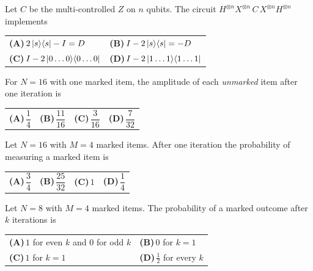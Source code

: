 \documentclass[11pt,a4paper]{article}
\newcommand{\optlabel}[1]{\textbf{(#1)}}
\newenvironment{qitem}[1]{\begin{list}{}{\setlength{\leftmargin}{3.3em}\setlength{\labelwidth}{3.1em}%
  \setlength{\labelsep}{0.2em}\setlength{\topsep}{3pt}\setlength{\parsep}{3pt}}\item[\textbf{Q.#1}\hfill]}{\end{list}}
\newcommand{\qsep}{\par\vspace{2pt}{\color{black!15}\hrule}\vspace{4pt}}
\begin{document}
\begin{qitem}{47}
Let $C$ be the multi-controlled $Z$ on $n$ qubits. The circuit $H^{\otimes n}X^{\otimes n}\,C\,X^{\otimes n}H^{\otimes n}$ implements
\par\smallskip\noindent\begin{tabularx}{\linewidth}{@{}*{2}{L}@{}}
\optlabel{A}\,$2\ket{s}\!\bra{s} - I = D$ & \optlabel{B}\,$I - 2\ket{s}\!\bra{s} = -D$ \\[3pt]
\optlabel{C}\,$I - 2\ket{0\dots0}\!\bra{0\dots0}$ & \optlabel{D}\,$I - 2\ket{1\dots1}\!\bra{1\dots1}$
\end{tabularx}
\end{qitem}
\qsep

\begin{qitem}{48}
For $N = 16$ with one marked item, the amplitude of each \emph{unmarked} item after one iteration is
\par\smallskip\noindent\begin{tabularx}{\linewidth}{@{}*{4}{L}@{}}
\optlabel{A}\,$\dfrac14$ & \optlabel{B}\,$\dfrac{11}{16}$ & \optlabel{C}\,$\dfrac{3}{16}$ & \optlabel{D}\,$\dfrac{7}{32}$
\end{tabularx}
\end{qitem}
\qsep

\begin{qitem}{49}
Let $N = 16$ with $M = 4$ marked items. After one iteration the probability of measuring a marked item is
\par\smallskip\noindent\begin{tabularx}{\linewidth}{@{}*{4}{L}@{}}
\optlabel{A}\,$\dfrac34$ & \optlabel{B}\,$\dfrac{25}{32}$ & \optlabel{C}\,$1$ & \optlabel{D}\,$\dfrac14$
\end{tabularx}
\end{qitem}
\qsep

\begin{qitem}{50}
Let $N = 8$ with $M = 4$ marked items. The probability of a marked outcome after $k$ iterations is
\par\smallskip\noindent\begin{tabularx}{\linewidth}{@{}*{2}{L}@{}}
\optlabel{A}\,$1$ for even $k$ and $0$ for odd $k$ & \optlabel{B}\,$0$ for $k = 1$ \\[3pt]
\optlabel{C}\,$1$ for $k = 1$ & \optlabel{D}\,$\frac12$ for every $k$
\end{tabularx}
\end{qitem}
\qsep
\end{document}
